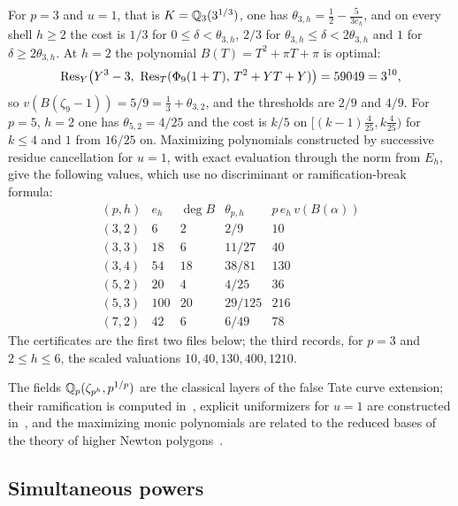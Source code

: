 \begin{example}\label{cost:ex:radical}
For $p=3$ and $u=1$, that is $K=\mathbb{Q}_3(3^{1/3})$, one has
$\theta_{3,h}=\tfrac12-\tfrac5{3e_h}$, and on every shell $h\ge2$ the cost is $1/3$ for
$0\le\delta<\theta_{3,h}$, $2/3$ for $\theta_{3,h}\le\delta<2\theta_{3,h}$ and $1$ for
$\delta\ge2\theta_{3,h}$. At $h=2$ the polynomial $B(T)=T^2+\pi T+\pi$ is optimal:
\[
 \Res_Y\bigl(Y^3-3,\ \Res_T(\Phi_9(1+T),\,T^2+YT+Y)\bigr)=59049=3^{10},
\]
so $v(B(\zeta_9-1))=5/9=\tfrac13+\theta_{3,2}$, and the thresholds are $2/9$ and $4/9$. For
$p=5$, $h=2$ one has $\theta_{5,2}=4/25$ and the cost is $k/5$ on
$[(k-1)\tfrac4{25},k\tfrac4{25})$ for $k\le4$ and $1$ from $16/25$ on. Maximizing
polynomials constructed by successive residue cancellation for $u=1$, with exact
evaluation through the norm from $E_h$, give the following values, which use no
discriminant or ramification-break formula:
\[
\begin{array}{c|r|r|c|r}
(p,h)&e_h&\deg B&\theta_{p,h}&p\,e_h\,v(B(\alpha))\\\hline
(3,2)&6&2&2/9&10\\
(3,3)&18&6&11/27&40\\
(3,4)&54&18&38/81&130\\
(5,2)&20&4&4/25&36\\
(5,3)&100&20&29/125&216\\
(7,2)&42&6&6/49&78
\end{array}
\]
The certificates are the first two files below; the third records, for $p=3$ and
$2\le h\le6$, the scaled valuations $10,40,130,400,1210$.
\end{example}

The fields $\mathbb{Q}_p(\zeta_{p^h},p^{1/p})$ are the classical layers of the false Tate curve
extension; their ramification is computed in~\cite{Viviani2004Ramification}, explicit
uniformizers for $u=1$ are constructed in~\cite{WangYuan2023Uniformizer}, and the
maximizing monic polynomials are related to the reduced bases of the theory of higher
Newton polygons~\cite{GuardiaMontesNart2015Higher}.

\subsection{Simultaneous powers}\label{tors:sec:powers}

